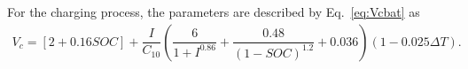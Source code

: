\documentclass[review]{elsarticle}
\begin{document}
%
%
For the charging process, the parameters are described by Eq.~\eqref{eq:Vcbat} as
%
\begin{multline}
\label{eq:Vcbat}
V_{c} = [2+0.16SOC]+ \dfrac{I}{C_{10}} \left( \dfrac{6}{1+I^{0.86}} + \dfrac{0.48}{(1-SOC)^{1.2}} + 0.036  \right) (1-0.025 \Delta T).
\end{multline}
%
%
%
\end{document}
